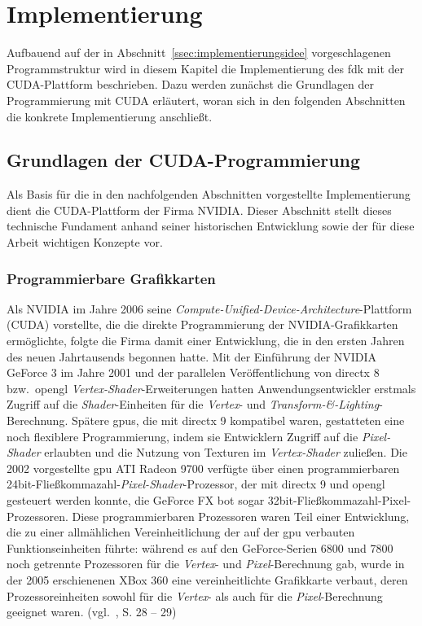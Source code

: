 \chapter{Implementierung}\label{chap:implementierung}

Aufbauend auf der in Abschnitt~\ref{ssec:implementierungsidee} vorgeschlagenen Programmstruktur wird in diesem Kapitel
die Implementierung des \gls{fdk} mit der CUDA-Plattform beschrieben. Dazu werden zunächst die Grundlagen der
Programmierung mit CUDA erläutert, woran sich in den folgenden Abschnitten die konkrete Implementierung anschließt.

\section{Grundlagen der CUDA-Programmierung}\label{sec:grundlagen_cuda}

Als Basis für die in den nachfolgenden Abschnitten vorgestellte Implementierung dient die CUDA-Plattform der Firma
NVIDIA\@. Dieser Abschnitt stellt dieses technische Fundament anhand seiner historischen Entwicklung sowie der für diese
Arbeit wichtigen Konzepte vor.

\subsection{Programmierbare Grafikkarten}\label{ssec:cu_prog_gpu}

Als NVIDIA im Jahre 2006 seine \textit{Compute-Unified-Device-Architecture}-Plattform (CUDA) vorstellte, die die
direkte Programmierung der NVIDIA-Grafikkarten ermöglichte, folgte die Firma damit einer Entwicklung, die in den ersten
Jahren des neuen Jahrtausends begonnen hatte. Mit der Einführung der NVIDIA GeForce 3 im Jahre 2001 und der parallelen
Veröffentlichung von \gls{directx} 8 bzw.\ \gls{opengl} \textit{Vertex-Shader}-Erweiterungen hatten Anwendungsentwickler
erstmals Zugriff auf die \textit{Shader}-Einheiten für die \textit{Vertex}- und
\textit{Transform-\&-Lighting}-Berechnung. Spätere \gls{gpu}s, die mit \gls{directx} 9 kompatibel waren, gestatteten
eine noch flexiblere Programmierung, indem sie Entwicklern Zugriff auf die \textit{Pixel-Shader} erlaubten und die
Nutzung von Texturen im \textit{Vertex-Shader} zuließen. Die 2002 vorgestellte \gls{gpu} ATI Radeon 9700 verfügte über
einen programmierbaren 24bit-Fließkommazahl-\textit{Pixel-Shader}-Prozessor, der mit \gls{directx} 9 und \gls{opengl}
gesteuert werden konnte, die GeForce FX bot sogar 32bit-Fließkommazahl-Pixel-Prozessoren. Diese programmierbaren
Prozessoren waren Teil einer Entwicklung, die zu einer allmählichen Vereinheitlichung der auf der \gls{gpu} verbauten
Funktionseinheiten führte: während es auf den GeForce-Serien 6800 und 7800 noch getrennte Prozessoren für die
\textit{Vertex}- und \textit{Pixel}-Berechnung gab, wurde in der 2005 erschienenen XBox 360 eine
{\glqq}vereinheitlichte{\grqq} Grafikkarte verbaut, deren Prozessoreinheiten sowohl für die \textit{Vertex}- als auch
für die \textit{Pixel}-Berechnung geeignet waren. (vgl.~\cite{kirkhwu}, S. 28 -- 29)

